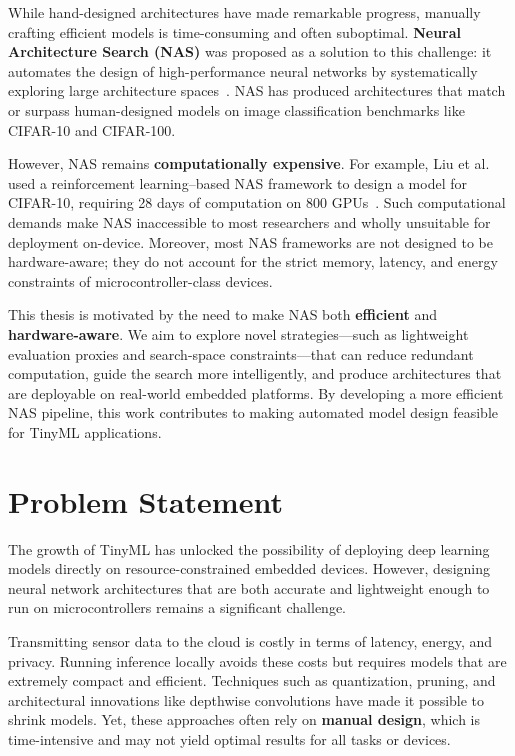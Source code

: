 While hand-designed architectures have made remarkable progress, manually crafting efficient models is time-consuming and often suboptimal. \textbf{Neural Architecture Search (NAS)} was proposed as a solution to this challenge: it automates the design of high-performance neural networks by systematically exploring large architecture spaces~\cite{liu2022survey}. NAS has produced architectures that match or surpass human-designed models on image classification benchmarks like CIFAR-10 and CIFAR-100.

However, NAS remains \textbf{computationally expensive}. For example, Liu et al. used a reinforcement learning–based NAS framework to design a model for CIFAR-10, requiring 28 days of computation on 800 GPUs~\cite{liu2022survey}. Such computational demands make NAS inaccessible to most researchers and wholly unsuitable for deployment on-device. Moreover, most NAS frameworks are not designed to be hardware-aware; they do not account for the strict memory, latency, and energy constraints of microcontroller-class devices.

This thesis is motivated by the need to make NAS both \textbf{efficient} and \textbf{hardware-aware}. We aim to explore novel strategies—such as lightweight evaluation proxies and search-space constraints—that can reduce redundant computation, guide the search more intelligently, and produce architectures that are deployable on real-world embedded platforms. By developing a more efficient NAS pipeline, this work contributes to making automated model design feasible for TinyML applications.

\section{Problem Statement}

The growth of TinyML has unlocked the possibility of deploying deep learning models directly on resource-constrained embedded devices. However, designing neural network architectures that are both accurate and lightweight enough to run on microcontrollers remains a significant challenge.

Transmitting sensor data to the cloud is costly in terms of latency, energy, and privacy. Running inference locally avoids these costs but requires models that are extremely compact and efficient. Techniques such as quantization, pruning, and architectural innovations like depthwise convolutions have made it possible to shrink models. Yet, these approaches often rely on \textbf{manual design}, which is time-intensive and may not yield optimal results for all tasks or devices.

